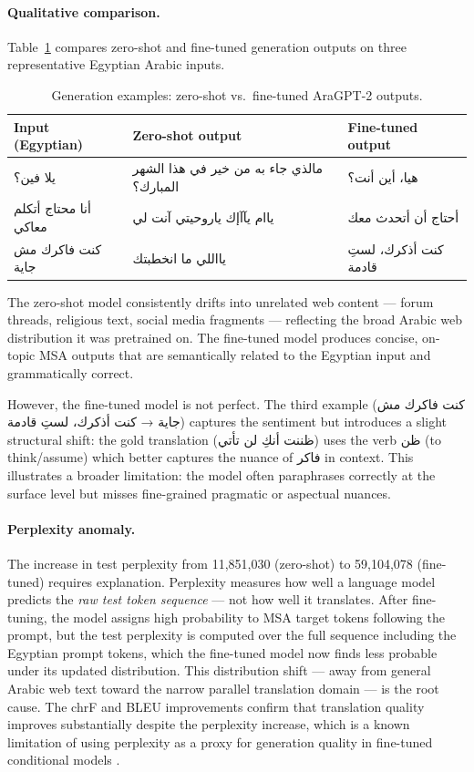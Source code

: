 \documentclass[11pt]{article}
\newcommand{\arb}[1]{{\arabicfont\beginR #1\endR}}
\begin{document}
\paragraph{Qualitative comparison.}
Table~\ref{tab:gen_examples} compares zero-shot and fine-tuned generation outputs on three representative Egyptian Arabic inputs.

\begin{table}[H]
\centering
\caption{Generation examples: zero-shot vs.\ fine-tuned AraGPT-2 outputs.}
\label{tab:gen_examples}
\small
\begin{tabular}{p{3.5cm}p{5cm}p{4cm}}
\toprule
\textbf{Input (Egyptian)} & \textbf{Zero-shot output} & \textbf{Fine-tuned output} \\
\midrule
\arb{يلا فين؟}
&
\arb{مالذي جاء به من خير في هذا الشهر المبارك؟}
&
\arb{هيا، أين أنت؟}
\\
\midrule
\arb{أنا محتاج أتكلم معاكي}
&
\arb{ياام يآآإك ياروحيتي آنت لي} 
&
\arb{أحتاج أن أتحدث معك}
\\
\midrule
\arb{كنت فاكرك مش جاية}
&
\arb{يااللي ما انخطبتك} 
&
\arb{كنت أذكرك، لستِ قادمة}
\\
\bottomrule
\end{tabular}
\end{table}

The zero-shot model consistently drifts into unrelated web content — forum threads, 
religious text, social media fragments — reflecting the broad Arabic web distribution 
it was pretrained on. The fine-tuned model produces concise, on-topic MSA outputs 
that are semantically related to the Egyptian input and grammatically correct.

However, the fine-tuned model is not perfect. The third example 
(\arb{كنت فاكرك مش جاية} → \arb{كنت أذكرك، لستِ قادمة}) 
captures the sentiment but introduces a slight structural shift: the gold 
translation (\arb{ظننت أنكِ لن تأتي}) uses the verb 
\arb{ظن} (to think/assume) which better captures the nuance of 
\arb{فاكر} in context. This illustrates a broader limitation: the 
model often paraphrases correctly at the surface level but misses fine-grained 
pragmatic or aspectual nuances.

\paragraph{Perplexity anomaly.}
The increase in test perplexity from 11,851,030 (zero-shot) to 59,104,078 (fine-tuned) requires explanation. Perplexity measures how well a language model predicts the \textit{raw test token sequence} — not how well it translates. After fine-tuning, the model assigns high probability to MSA target tokens following the prompt, but the test perplexity is computed over the full sequence including the Egyptian prompt tokens, which the fine-tuned model now finds less probable under its updated distribution. This distribution shift — away from general Arabic web text toward the narrow parallel translation domain — is the root cause. The chrF and BLEU improvements confirm that translation quality improves substantially despite the perplexity increase, which is a known limitation of using perplexity as a proxy for generation quality in fine-tuned conditional models \cite{zhang2021}.
\end{document}
